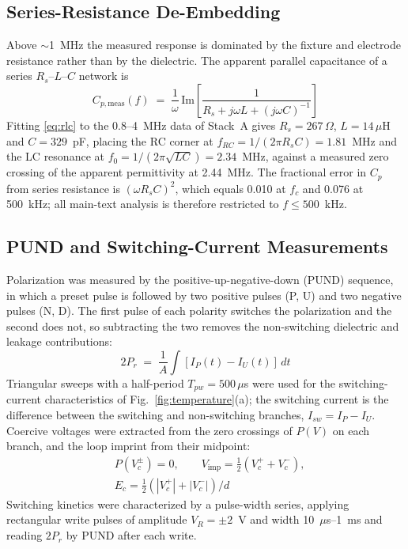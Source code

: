 \documentclass[journal]{IEEEtran}
\newcommand{\fc}{f_{c}}
\begin{document}
\subsection{Series-Resistance De-Embedding}
Above $\sim$1~MHz the measured response is dominated by the fixture and
electrode resistance rather than by the dielectric. The apparent parallel
capacitance of a series $R_s$--$L$--$C$ network is
\begin{equation}
C_{p,\mathrm{meas}}(f) \;=\; \frac{1}{\omega}\,
\mathrm{Im}\!\left[\frac{1}{R_s + j\omega L + (j\omega C)^{-1}}\right]
\label{eq:rlc}
\end{equation}
Fitting \eqref{eq:rlc} to the 0.8--4~MHz data of Stack~A gives
$R_s = 267\,\Omega$, $L = 14\,\mu$H and $C = 329$~pF, placing the RC corner
at $f_{RC} = 1/(2\pi R_s C) = 1.81$~MHz and the LC resonance at
$f_0 = 1/(2\pi\sqrt{LC}) = 2.34$~MHz, against a measured zero crossing of the
apparent permittivity at 2.44~MHz. The fractional error in $C_p$ from series
resistance is $(\omega R_s C)^2$, which equals 0.010 at $\fc$ and 0.076 at
500~kHz; all main-text analysis is therefore restricted to $f \le 500$~kHz.

\subsection{PUND and Switching-Current Measurements}
Polarization was measured by the positive-up-negative-down (PUND) sequence,
in which a preset pulse is followed by two positive pulses (P, U) and two
negative pulses (N, D). The first pulse of each polarity switches the
polarization and the second does not, so subtracting the two removes the
non-switching dielectric and leakage contributions:
\begin{equation}
2P_r \;=\; \frac{1}{A}\int \left[I_P(t) - I_U(t)\right]\,dt
\label{eq:pund}
\end{equation}
Triangular sweeps with a half-period $T_{pw} = 500\,\mu$s were used for the
switching-current characteristics of Fig.~\ref{fig:temperature}(a); the
switching current is the difference between the switching and non-switching
branches, $I_{sw} = I_P - I_U$. Coercive voltages were extracted from the
zero crossings of $P(V)$ on each branch, and the loop imprint from their
midpoint:
\begin{equation}
\begin{aligned}
&P(V_c^{\pm}) = 0, \qquad
V_{\mathrm{imp}} = \tfrac{1}{2}\left(V_c^{+} + V_c^{-}\right),\\[2pt]
&E_c = \tfrac{1}{2}\left(|V_c^{+}| + |V_c^{-}|\right)\big/ d
\end{aligned}
\label{eq:coercive}
\end{equation}
Switching kinetics were characterized by a pulse-width series, applying
rectangular write pulses of amplitude $V_R = \pm2$~V and width
10~$\mu$s--1~ms and reading $2P_r$ by PUND after each write.
\end{document}
